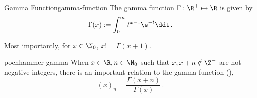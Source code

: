 \begin{definition}{Gamma Function}{gamma-function}
  The gamma function $\Gamma: \R^+ \mapsto \R$ is given by
  $$\Gamma(x) := \int_0^\infty t^{x-1}\e^{-t} \ddt\,.$$
\end{definition}

Most importantly, for $x \in \N_0$, $x! = \Gamma(x+1)$.

\begin{remark}{}{pochhammer-gamma}
  When $x \in \R, n \in \N_0$ such that $x, x+n \notin \Z^-$ are not negative integers, there is an important relation to the gamma function (),
  $$(x)_n = \frac{\Gamma(x+n)}{\Gamma(x)}\,.$$
\end{remark}
